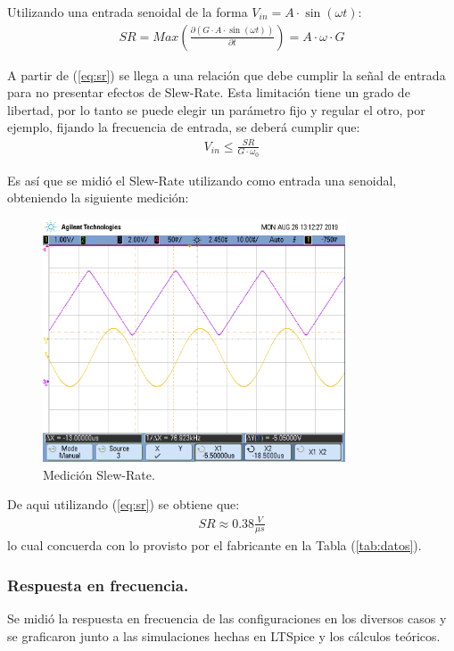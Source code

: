 Utilizando una entrada senoidal de la forma $V_{in}=A\cdot \sin (\omega t)$:
\begin{align}
	SR= Max\left( \frac{\partial (G\cdot A\cdot \sin (\omega t))}{\partial t}\right) = A \cdot \omega \cdot G  
\label{eq:sr}
\end{align}

A partir de (\ref{eq:sr}) se llega a una relación que debe cumplir la señal de entrada para no presentar efectos de Slew-Rate. Esta limitación tiene un grado de libertad, por lo tanto se puede elegir un parámetro fijo y regular el otro, por ejemplo, fijando la frecuencia de entrada, se deberá cumplir que:
\begin{align} V_{in}	\leq \frac{SR}{G\cdot \omega_0}\end{align}

Es así que se midió el Slew-Rate utilizando como entrada una senoidal, obteniendo la siguiente medición:
\begin{figure}[H]	
	\centering
	\includegraphics[width=0.8\textwidth, trim = {0 3.3cm 0 2cm},clip]{Ejercicio1/Imagenes/slew_rate1.png}
	\caption{Medición Slew-Rate.}
	\label{fig:SlewRate}
\end{figure}
De aqui utilizando (\ref{eq:sr}) se obtiene que:
\begin{align}
SR \approx  0.38 \frac{V}{\mu s}
\end{align}
lo cual concuerda con lo provisto por el fabricante en la Tabla (\ref{tab:datos}).
\subsubsection{Respuesta en frecuencia.}
Se midió la respuesta en frecuencia de las configuraciones en los diversos casos y se graficaron junto a las simulaciones hechas en LTSpice y los cálculos teóricos.

